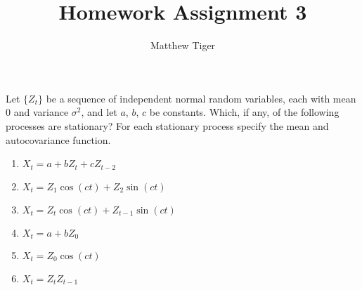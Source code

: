 \documentclass[12pt]{article}
\title{Homework Assignment 3}
\author{Matthew Tiger}
\theoremstyle{definition}
\newenvironment{custompbm}[1]
  {\renewcommand\theproblem{#1}\problem}
  {\endproblem}
\begin{document}
\maketitle


\begin{custompbm}{1.4}
  Let $\{ Z_t \}$ be a sequence of independent normal random variables, each with
  mean $0$ and variance $\sigma^2$, and let $a$, $b$, $c$ be constants. Which,
  if any, of the following processes are stationary? For each stationary process
  specify the mean and autocovariance function.
  \begin{enumerate}
    \item $X_t = a + bZ_t + cZ_{t-2}$
    \item $X_t = Z_1 \cos(ct) + Z_2 \sin(ct)$
    \item $X_t = Z_t \cos(ct) + Z_{t-1} \sin(ct)$
    \item $X_t = a + bZ_0$
    \item $X_t = Z_0\cos(ct)$
    \item $X_t = Z_tZ_{t-1}$
  \end{enumerate}
\end{custompbm}
\end{document}
